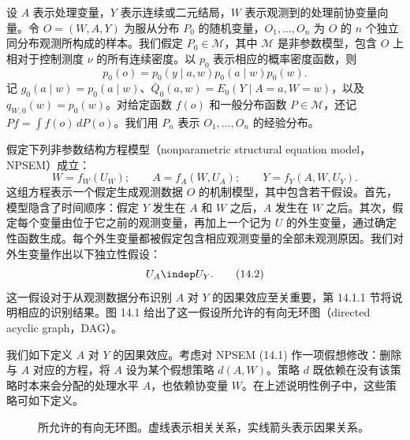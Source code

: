 设 $A$ 表示处理变量，$Y$ 表示连续或二元结局，$W$ 表示观测到的处理前协变量向量。令 $O=(W,A,Y)$ 为服从分布 $P_0$ 的随机变量，$O_1,\ldots,O_n$ 为 $O$ 的 $n$ 个独立同分布观测所构成的样本。我们假定 $P_0\in\mathcal M$，其中 $\mathcal M$ 是非参数模型，包含 $O$ 上相对于控制测度 $\nu$ 的所有连续密度。以 $p_0$ 表示相应的概率密度函数，则
\[
 p_0(o)=p_0(y\mid a,w)p_0(a\mid w)p_0(w).
\]
记 $g_0(a\mid w)=p_0(a\mid w)$、$\bar Q_0(a,w)=E_0(Y\mid A=a,W=w)$，以及 $q_{W,0}(w)=p_0(w)$。对给定函数 $f(o)$ 和一般分布函数 $P\in\mathcal M$，还记 $Pf=\int f(o)\,dP(o)$。我们用 $P_n$ 表示 $O_1,\ldots,O_n$ 的经验分布。

假定下列非参数结构方程模型（nonparametric structural equation model，NPSEM）成立：
\begin{equation}
 W=f_W(U_W);\qquad A=f_A(W,U_A);\qquad Y=f_Y(A,W,U_Y).
 \tag{14.1}
\end{equation}
这组方程表示一个假定生成观测数据 $O$ 的机制模型，其中包含若干假设。首先，模型隐含了时间顺序：假定 $Y$ 发生在 $A$ 和 $W$ 之后，$A$ 发生在 $W$ 之后。其次，假定每个变量由位于它之前的观测变量，再加上一个记为 $U$ 的外生变量，通过确定性函数生成。每个外生变量都被假定包含相应观测变量的全部未观测原因。我们对外生变量作出以下独立性假设：
\begin{equation}
 U_A\indep U_Y.
 \tag{14.2}
\end{equation}
这一假设对于从观测数据分布识别 $A$ 对 $Y$ 的因果效应至关重要，第 14.1.1 节将说明相应的识别结果。图 14.1 给出了这一假设所允许的有向无环图（directed acyclic graph，DAG）。

我们如下定义 $A$ 对 $Y$ 的因果效应。考虑对 NPSEM (14.1) 作一项假想修改：删除与 $A$ 对应的方程，将 $A$ 设为某个假想策略 $d(A,W)$。策略 $d$ 既依赖在没有该策略时本来会分配的处理水平 $A$，也依赖协变量 $W$。在上述说明性例子中，这些策略可如下定义。

\begin{figure}[htbp]
 \centering
 
 \caption{所允许的有向无环图。虚线表示相关关系，实线箭头表示因果关系。}
 \label{fig:ch14-allowed-dags}
\end{figure}


